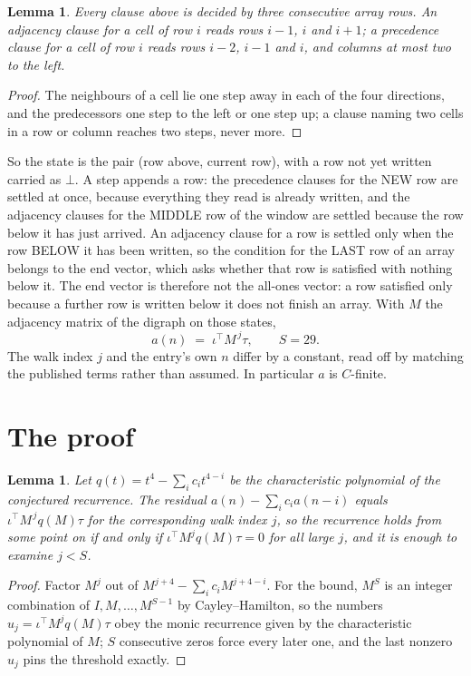 \documentclass[11pt,a4paper]{article}
\theoremstyle{plain}
\newtheorem{lemma}[theorem]{Lemma}
\theoremstyle{definition}
\begin{document}
\begin{lemma}\label{lem:win}
Every clause above is decided by three consecutive array rows. An adjacency clause for a cell
of row $i$ reads rows $i-1$, $i$ and $i+1$; a precedence clause for a cell of row $i$ reads
rows $i-2$, $i-1$ and $i$, and columns at most two to the left.
\end{lemma}

\begin{proof}
The neighbours of a cell lie one step away in each of the four directions, and the predecessors
one step to the left or one step up; a clause naming two cells in a row or column reaches two
steps, never more.
\end{proof}

So the state is the pair (row above, current row), with a row not yet written carried as
$\bot$. A step appends a row: the precedence clauses for the NEW row are settled at once,
because everything they read is already written, and the adjacency clauses for the MIDDLE row
of the window are settled because the row below it has just arrived. An adjacency clause for a row is settled only when the row BELOW it has been
written, so the condition for the LAST row of an array belongs to the end vector, which asks
whether that row is satisfied with nothing below it. The end vector is therefore not the
all-ones vector: a row satisfied only because a further row is written below it does not
finish an array. With $M$ the
adjacency matrix of the digraph on those states,
\[
a(n)\;=\;\iota^{\!\top}M^{\,j}\tau ,\qquad S=29.
\]
The walk index $j$ and the entry's own $n$ differ by a constant, read off by matching the
published terms rather than assumed. In particular $a$ is $C$-finite.

\section{The proof}

\begin{lemma}\label{lem:crit}
Let $q(t)=t^{4}-\sum_i c_it^{4-i}$ be the characteristic polynomial of the
conjectured recurrence. The residual $a(n)-\sum_ic_ia(n-i)$ equals
$\iota^{\!\top}M^{\,j}q(M)\tau$ for the corresponding walk index $j$, so the recurrence
holds from some point on if and only if $\iota^{\!\top}M^{j}q(M)\tau=0$ for all large $j$,
and it is enough to examine $j<S$.
\end{lemma}

\begin{proof}
Factor $M^{j}$ out of $M^{j+4}-\sum_ic_iM^{j+4-i}$. For the bound, $M^{S}$
is an integer combination of $I,M,\dots,M^{S-1}$ by Cayley--Hamilton, so the numbers
$u_j=\iota^{\!\top}M^{j}q(M)\tau$ obey the monic recurrence given by the characteristic
polynomial of $M$; $S$ consecutive zeros force every later one, and the last nonzero $u_j$
pins the threshold exactly.
\end{proof}
\end{document}
